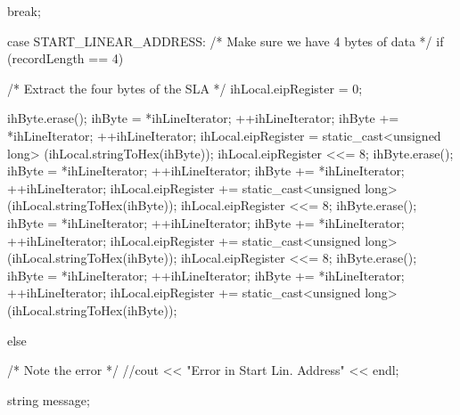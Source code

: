 \begin{DoxyCode}
{{{{{                        break;
                        
                    case START_LINEAR_ADDRESS:
                        /* Make sure we have 4 bytes of data                  */
                        if (recordLength == 4)
                        {
                            /* Extract the four bytes of the SLA              */
                            ihLocal.eipRegister = 0;
                            
                            ihByte.erase();
                            ihByte = *ihLineIterator;
                            ++ihLineIterator;
                            ihByte += *ihLineIterator;
                            ++ihLineIterator;
                            ihLocal.eipRegister = static_cast<unsigned long>
                                                  (ihLocal.stringToHex(ihByte));
                            ihLocal.eipRegister <<= 8;
                            ihByte.erase();
                            ihByte = *ihLineIterator;
                            ++ihLineIterator;
                            ihByte += *ihLineIterator;
                            ++ihLineIterator;
                            ihLocal.eipRegister += static_cast<unsigned long>
                                                  (ihLocal.stringToHex(ihByte));
                            ihLocal.eipRegister <<= 8;
                            ihByte.erase();
                            ihByte = *ihLineIterator;
                            ++ihLineIterator;
                            ihByte += *ihLineIterator;
                            ++ihLineIterator;
                            ihLocal.eipRegister += static_cast<unsigned long>
                                                  (ihLocal.stringToHex(ihByte));
                            ihLocal.eipRegister <<= 8;
                            ihByte.erase();
                            ihByte = *ihLineIterator;
                            ++ihLineIterator;
                            ihByte += *ihLineIterator;
                            ++ihLineIterator;
                            ihLocal.eipRegister += static_cast<unsigned long>
                                                  (ihLocal.stringToHex(ihByte));
                        }
                        else
                        {
                            /* Note the error                                 */
                            //cout << "Error in Start Lin. Address" << endl;
                            
                            string message;
                            
}}}}}}
\end{DoxyCode}
